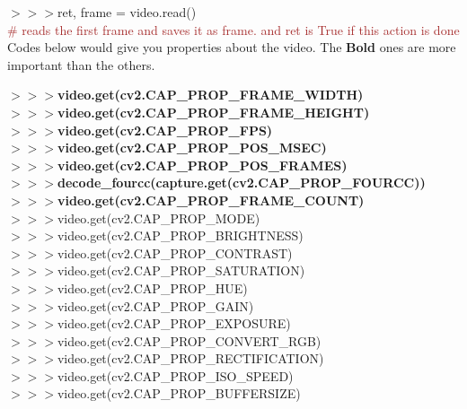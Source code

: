 \documentclass[a4paper,18pt]{article}
\begin{document}
$>>>$ret, frame = video.read()\\{\textcolor{brown}{\# reads the first frame and saves it as frame. and ret is True if this action is done}}\\

Codes below would give you properties about the video. The \textbf{Bold} ones are more important than the others.

$>>>$\textbf{video.get(cv2.CAP\_PROP\_FRAME\_WIDTH)}\\
\hspace*{14pt}$>>>$\textbf{video.get(cv2.CAP\_PROP\_FRAME\_HEIGHT)}\\
\hspace*{14pt}$>>>$\textbf{video.get(cv2.CAP\_PROP\_FPS)}\\
\hspace*{14pt}$>>>$\textbf{video.get(cv2.CAP\_PROP\_POS\_MSEC)}\\
\hspace*{14pt}$>>>$\textbf{video.get(cv2.CAP\_PROP\_POS\_FRAMES)}\\
\hspace*{14pt}$>>>$\textbf{decode\_fourcc(capture.get(cv2.CAP\_PROP\_FOURCC))}\\
\hspace*{14pt}$>>>$\textbf{video.get(cv2.CAP\_PROP\_FRAME\_COUNT)}\\
\hspace*{14pt}$>>>$video.get(cv2.CAP\_PROP\_MODE)\\
\hspace*{14pt}$>>>$video.get(cv2.CAP\_PROP\_BRIGHTNESS)\\
\hspace*{14pt}$>>>$video.get(cv2.CAP\_PROP\_CONTRAST)\\
\hspace*{14pt}$>>>$video.get(cv2.CAP\_PROP\_SATURATION)\\
\hspace*{14pt}$>>>$video.get(cv2.CAP\_PROP\_HUE)\\
\hspace*{14pt}$>>>$video.get(cv2.CAP\_PROP\_GAIN)\\
\hspace*{14pt}$>>>$video.get(cv2.CAP\_PROP\_EXPOSURE)\\
\hspace*{14pt}$>>>$video.get(cv2.CAP\_PROP\_CONVERT\_RGB)\\
\hspace*{14pt}$>>>$video.get(cv2.CAP\_PROP\_RECTIFICATION)\\
\hspace*{14pt}$>>>$video.get(cv2.CAP\_PROP\_ISO\_SPEED)\\
\hspace*{14pt}$>>>$video.get(cv2.CAP\_PROP\_BUFFERSIZE)\\
\end{document}
